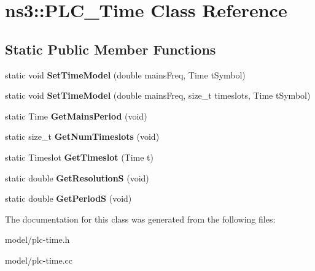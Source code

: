 \hypertarget{classns3_1_1PLC__Time}{\section{ns3\-:\-:\-P\-L\-C\-\_\-\-Time \-Class \-Reference}
\label{classns3_1_1PLC__Time}
}
\subsection*{\-Static \-Public \-Member \-Functions}
\begin{DoxyCompactItemize}
\item 
\hypertarget{classns3_1_1PLC__Time_a35823a5873068e49ca0a736834ca85f6}{static void {\bfseries \-Set\-Time\-Model} (double mains\-Freq, \-Time t\-Symbol)}\label{classns3_1_1PLC__Time_a35823a5873068e49ca0a736834ca85f6}

\item 
\hypertarget{classns3_1_1PLC__Time_aef58f3ce26761a3ddd96a3319a93d6ae}{static void {\bfseries \-Set\-Time\-Model} (double mains\-Freq, size\-\_\-t timeslots, \-Time t\-Symbol)}\label{classns3_1_1PLC__Time_aef58f3ce26761a3ddd96a3319a93d6ae}

\item 
\hypertarget{classns3_1_1PLC__Time_ad443cebbce29e54cafdb5d896c6cd4fa}{static \-Time {\bfseries \-Get\-Mains\-Period} (void)}\label{classns3_1_1PLC__Time_ad443cebbce29e54cafdb5d896c6cd4fa}

\item 
\hypertarget{classns3_1_1PLC__Time_ac1992dc1a3aff7c18345cf896f8c73cb}{static size\-\_\-t {\bfseries \-Get\-Num\-Timeslots} (void)}\label{classns3_1_1PLC__Time_ac1992dc1a3aff7c18345cf896f8c73cb}

\item 
\hypertarget{classns3_1_1PLC__Time_a1a883e09be6fe4c5586b831e426fd602}{static \-Timeslot {\bfseries \-Get\-Timeslot} (\-Time t)}\label{classns3_1_1PLC__Time_a1a883e09be6fe4c5586b831e426fd602}

\item 
\hypertarget{classns3_1_1PLC__Time_a4e075d2ddc9c00873b859c5b54117c81}{static double {\bfseries \-Get\-Resolution\-S} (void)}\label{classns3_1_1PLC__Time_a4e075d2ddc9c00873b859c5b54117c81}

\item 
\hypertarget{classns3_1_1PLC__Time_a125b207782e20bba3b4b2017caa96ccc}{static double {\bfseries \-Get\-Period\-S} (void)}\label{classns3_1_1PLC__Time_a125b207782e20bba3b4b2017caa96ccc}

\end{DoxyCompactItemize}


\-The documentation for this class was generated from the following files\-:\begin{DoxyCompactItemize}
\item 
model/plc-\/time.\-h\item 
model/plc-\/time.\-cc\end{DoxyCompactItemize}

